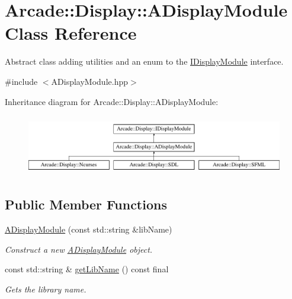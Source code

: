 \hypertarget{classArcade_1_1Display_1_1ADisplayModule}{}\section{Arcade\+::Display\+::A\+Display\+Module Class Reference}
\label{classArcade_1_1Display_1_1ADisplayModule}


Abstract class adding utilities and an enum to the \mbox{\hyperlink{classArcade_1_1Display_1_1IDisplayModule}{I\+Display\+Module}} interface.  




{\ttfamily \#include $<$A\+Display\+Module.\+hpp$>$}

Inheritance diagram for Arcade\+::Display\+::A\+Display\+Module\+:\begin{figure}[H]
\begin{center}
\leavevmode
\includegraphics[height=2.679426cm]{classArcade_1_1Display_1_1ADisplayModule}
\end{center}
\end{figure}
\subsection*{Public Member Functions}
\begin{DoxyCompactItemize}
\item 
\mbox{\hyperlink{classArcade_1_1Display_1_1ADisplayModule_a0aee6322d97b3a421e301c8f0830733e}{A\+Display\+Module}} (const std\+::string \&lib\+Name)
\begin{DoxyCompactList}\small\item\em Construct a new \mbox{\hyperlink{classArcade_1_1Display_1_1ADisplayModule}{A\+Display\+Module}} object. \end{DoxyCompactList}\item 
const std\+::string \& \mbox{\hyperlink{classArcade_1_1Display_1_1ADisplayModule_a0f7d98b279058994f41978b17bb14222}{get\+Lib\+Name}} () const final
\begin{DoxyCompactList}\small\item\em Gets the library name. \end{DoxyCompactList}\end{DoxyCompactItemize}
